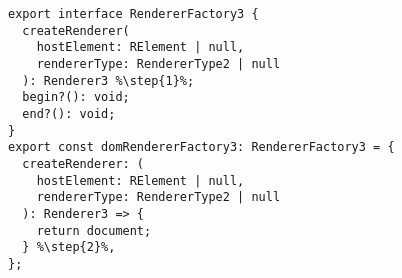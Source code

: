\begin{verbatim}
export interface RendererFactory3 {
  createRenderer(
    hostElement: RElement | null,
    rendererType: RendererType2 | null
  ): Renderer3 %\step{1}%;
  begin?(): void;
  end?(): void;
}
export const domRendererFactory3: RendererFactory3 = {
  createRenderer: (
    hostElement: RElement | null,
    rendererType: RendererType2 | null
  ): Renderer3 => {
    return document;
  } %\step{2}%,
};
\end{verbatim}
